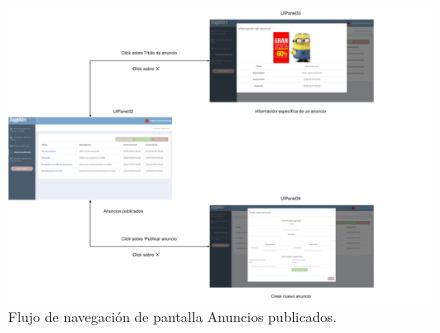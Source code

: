 \FloatBarrier
\begin{figure}[htbp!]
		\centering
			\includegraphics[width=1 \textwidth]{imagenes/paneladminmapa/anuncios3}
		\caption{Flujo de navegación de pantalla Anuncios publicados.}
		\label{PA:flujoAnuncios}
\end{figure}
\FloatBarrier

